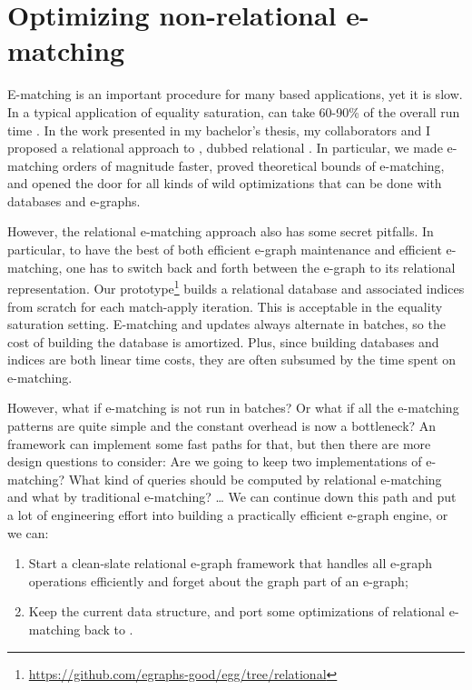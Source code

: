 \chapter{Optimizing non-relational e-matching}

E-matching is an important procedure for many \egraph based applications,
 yet it is slow.
In a typical application of equality saturation,
 \ematching can take 60-90\% of the overall run time \citep{egg}.
In the work presented in my bachelor's thesis, 
 my collaborators and I proposed a relational approach to \ematching, 
 dubbed relational \ematching \citep{relational-ematching, relational-ematching-thesis}.
In particular,
 we made e-matching orders of magnitude faster, 
 proved theoretical bounds of e-matching, 
 and opened the door for all kinds of
 wild optimizations that can be done with databases and e-graphs.


However, 
 the relational e-matching approach also has some secret pitfalls.
In particular, 
 to have the best of both efficient e-graph maintenance and efficient e-matching, 
 one has to switch back and forth 
 between the e-graph to its relational representation.
Our prototype\footnote{\url{https://github.com/egraphs-good/egg/tree/relational}}
 builds a relational database and associated indices from
 scratch for each match-apply iteration.
This is acceptable in the equality saturation setting.
E-matching and updates always alternate in batches, 
 so the cost of building the database is amortized.
Plus, 
 since building databases and indices are both linear time costs, 
 they are often subsumed by the time spent on e-matching.

However, 
 what if e-matching is not run in batches? 
Or what if all the e-matching patterns are quite simple 
 and the constant overhead is now a bottleneck? 
An \egraph framework can implement some fast paths for that, 
 but then there are more design questions to consider: 
Are we going to keep two implementations of e-matching? 
What kind of queries should be computed by relational
 e-matching and what by traditional e-matching? \ldots{} 
We can continue down this path and put a lot of engineering effort into
 building a practically efficient e-graph engine, or we can:

\begin{enumerate}
\item
  Start a clean-slate relational e-graph framework that handles all
  e-graph operations efficiently and forget about the graph part of an
  e-graph;
\item
  Keep the current \egraph data structure, and port some optimizations of
  relational e-matching back to \egraphs.
\end{enumerate}

